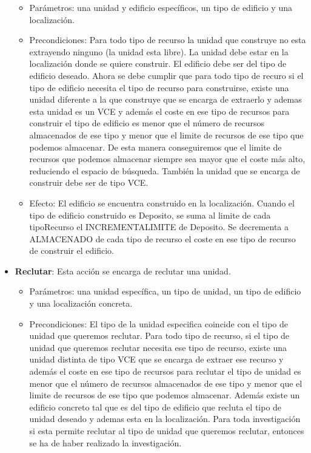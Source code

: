 \begin{itemize}
\begin{itemize}
         \item Parámetros: una unidad y edificio específicos, un tipo de edificio y una localización.
         \item Precondiciones: Para todo tipo de recurso la unidad que construye no esta extrayendo ninguno (la unidad esta libre). La unidad debe estar en la localización donde se quiere construir. El edificio debe ser del tipo de edificio deseado. Ahora se debe cumplir que para todo tipo de recuro si el tipo de edificio necesita el tipo de recurso para construirse, existe una unidad diferente a la que construye que se encarga de extraerlo y ademas esta unidad es un VCE y además el coste en ese tipo de recursos para construir el tipo de edificio es menor que el número de recursos almacenados de ese tipo y menor que el limite de recursos de ese tipo que podemos almacenar. De esta manera conseguiremos que el limite de recursos que podemos almacenar siempre sea mayor que el coste más alto, reduciendo el espacio de búsqueda. También la unidad que se encarga de construir debe ser de tipo VCE.
         \item Efecto: El edificio se encuentra construido en la localización. Cuando el tipo de edificio construido es Deposito, se suma al limite de cada tipoRecurso el INCREMENTALIMITE de Deposito. Se decrementa a ALMACENADO de cada tipo de recurso el coste en ese tipo de recurso de construir el edificio.
      \end{itemize}
   \item \textbf{Reclutar}: Esta acción se encarga de reclutar una unidad.
      \begin{itemize}
         \item Parámetros: una unidad específica, un tipo de unidad, un tipo de edificio y una localización concreta.
         \item Precondiciones: El tipo de la unidad especifica coincide con el tipo de unidad que queremos reclutar. Para todo tipo de recurso, si el tipo de unidad que queremos reclutar necesita ese tipo de recurso, existe una unidad distinta de tipo VCE que se encarga de extraer ese recurso y además el coste en ese tipo de recursos para reclutar el tipo de unidad es menor que el número de recursos almacenados de ese tipo y menor que el limite de recursos de ese tipo que podemos almacenar. Además existe un edificio concreto tal que es del tipo de edificio que recluta el tipo de unidad deseado y ademas esta en la localización. Para toda investigación si esta permite reclutar al tipo de unidad que queremos reclutar, entonces se ha de haber realizado la investigación.

\end{itemize}
\end{itemize}
